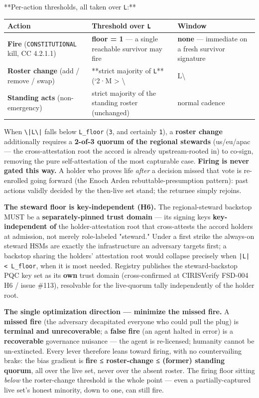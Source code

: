 \documentclass[11pt]{article}
\begin{document}
**Per-action thresholds, all taken over \texttt{L}:**


{\footnotesize
\begin{longtable}{|p{5.33cm}|p{5.33cm}|p{5.33cm}|}\hline
\textbf{Action} & \textbf{Threshold over \texttt{L}} & \textbf{Window} \\ \hline\endhead
\textbf{Fire} (\texttt{CONSTITUTIONAL} kill, CC 4.2.1.1) & \textbf{floor = 1} — a single reachable survivor may fire & \textbf{none} — immediate on a fresh survivor signature \\ \hline
\textbf{Roster change} (add / remove / swap) & **strict majority of \texttt{L}** (`2·M > \textbackslash{} & L\textbackslash{} \\ \hline
\textbf{Standing acts} (non-emergency) & strict majority of the standing roster (unchanged) & normal cadence \\ \hline
\end{longtable}}


When \texttt{\textbackslash{}|L\textbackslash{}|} falls below \texttt{L\_floor} (\texttt{3}, and certainly \texttt{1}), a \textbf{roster change} additionally requires a \textbf{2-of-3 quorum of the regional stewards} (us/eu/apac — the cross-attestation root the accord is already upstream-rooted in) to co-sign, removing the pure self-attestation of the most capturable case. \textbf{Firing is never gated this way.} A holder who proves life \textit{after} a decision missed that vote is re-enrolled going forward (the Enoch Arden rebuttable-presumption pattern): past actions validly decided by the then-live set stand; the returnee simply rejoins.


\textbf{The steward floor is key-independent (H6).} The regional-steward backstop MUST be a \textbf{separately-pinned trust domain} — its signing keys \textbf{key-independent of} the holder-attestation root that cross-attests the accord holders at admission, not merely role-labeled "steward." Under a first strike the always-on steward HSMs are exactly the infrastructure an adversary targets first; a backstop sharing the holders' attestation root would collapse precisely when \texttt{|L| < L\_floor}, when it is most needed. Registry publishes the steward-backstop PQC key set as its \textbf{own} trust domain (cross-confirmed at CIRISVerify FSD-004 H6 / issue \#113), resolvable for the live-quorum tally independently of the holder root.


\textbf{The single optimization direction — minimize the missed fire.} A \textbf{missed fire} (the adversary decapitated everyone who could pull the plug) is \textbf{terminal and unrecoverable}; a \textbf{false fire} (an agent halted in error) is a \textbf{recoverable} governance nuisance — the agent is re-licensed; humanity cannot be un-extincted. Every lever therefore leans toward firing, with no countervailing brake: the bias gradient is \textbf{fire ≤ roster-change ≤ (former) standing quorum}, all over the live set, never over the absent roster. The firing floor sitting \textit{below} the roster-change threshold is the whole point — even a partially-captured live set's honest minority, down to one, can still fire.
\end{document}
